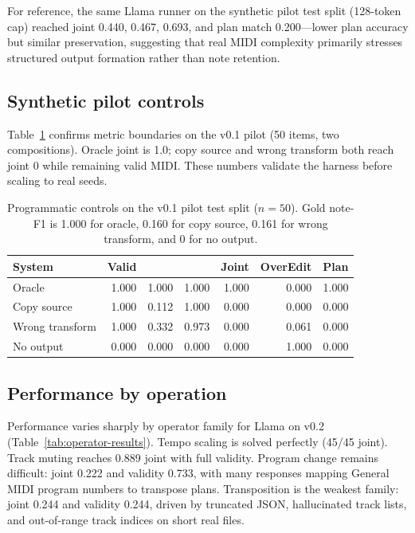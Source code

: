 For reference, the same Llama runner on the synthetic pilot test split (128-token cap) reached joint 0.440, \edit{} 0.467, \preserve{} 0.693, and plan match 0.200---lower plan accuracy but similar preservation, suggesting that real MIDI complexity primarily stresses structured output formation rather than note retention.

\subsection{Synthetic pilot controls}

Table~\ref{tab:control-results} confirms metric boundaries on the v0.1 pilot (50 items, two compositions). Oracle joint is 1.0; copy source and wrong transform both reach joint 0 while remaining valid MIDI. These numbers validate the harness before scaling to real seeds.

\begin{table}[t]
\centering
\small
\setlength{\tabcolsep}{4pt}
\begin{tabular}{lrrrrrr}
\toprule
System & Valid & \edit{} & \preserve{} & Joint & OverEdit & Plan \\
\midrule
Oracle & 1.000 & 1.000 & 1.000 & 1.000 & 0.000 & 1.000 \\
Copy source & 1.000 & 0.112 & 1.000 & 0.000 & 0.000 & 0.000 \\
Wrong transform & 1.000 & 0.332 & 0.973 & 0.000 & 0.061 & 0.000 \\
No output & 0.000 & 0.000 & 0.000 & 0.000 & 1.000 & 0.000 \\
\bottomrule
\end{tabular}
\caption{Programmatic controls on the v0.1 pilot test split ($n{=}50$). Gold note-F1 is 1.000 for oracle, 0.160 for copy source, 0.161 for wrong transform, and 0 for no output.}
\label{tab:control-results}
\end{table}

\subsection{Performance by operation}

Performance varies sharply by operator family for Llama on v0.2 (Table~\ref{tab:operator-results}). Tempo scaling is solved perfectly (45/45 joint). Track muting reaches 0.889 joint with full validity. Program change remains difficult: joint 0.222 and validity 0.733, with many responses mapping General MIDI program numbers to transpose plans. Transposition is the weakest family: joint 0.244 and validity 0.244, driven by truncated JSON, hallucinated track lists, and out-of-range track indices on short real files.

